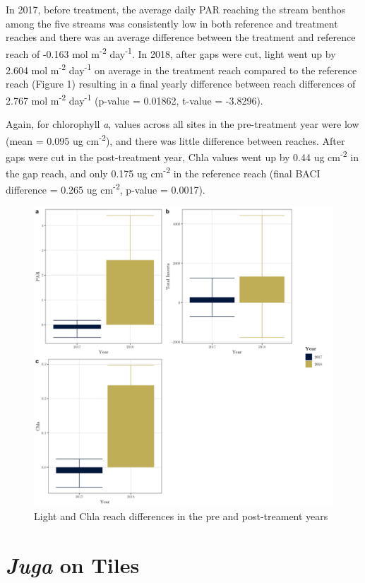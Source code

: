 \documentclass[double,12pt]{beavtex}
\begin{document}
  In 2017, before treatment, the average daily PAR reaching the stream
  benthos among the five streams was consistently low in both reference
  and treatment reaches and there was an average difference between the
  treatment and reference reach of -0.163 mol m\textsuperscript{-2}
  day\textsuperscript{-1}. In 2018, after gaps were cut, light went up by
  2.604 mol m\textsuperscript{-2} day\textsuperscript{-1} on average in
  the treatment reach compared to the reference reach (Figure 1) resulting
  in a final yearly difference between reach differences of 2.767 mol
  m\textsuperscript{-2} day\textsuperscript{-1} (p-value = 0.01862,
  t-value = -3.8296).
  
  Again, for chlorophyll \emph{a}, values across all sites in the
  pre-treatment year were low (mean = 0.095 ug cm\textsuperscript{-2}),
  and there was little difference between reaches. After gaps were cut in
  the post-treatment year, Chla values went up by 0.44 ug
  cm\textsuperscript{-2} in the gap reach, and only 0.175 ug
  cm\textsuperscript{-2} in the reference reach (final BACI difference =
  0.265 ug cm\textsuperscript{-2}, p-value = 0.0017).
  
  \begin{figure}
  
  {\centering \includegraphics[width=0.6\linewidth]{Figures/Vars_Reach_Diffs} 
  
  }
  
  \caption[Light and Chla reach differences in the pre and post-treament years \label{Chla-Light}]{Light and Chla reach differences in the pre and post-treament years \label{Chla-Light}}\label{fig:unnamed-chunk-1}
  \end{figure}
  
  \section*{\texorpdfstring{\emph{Juga} on
  Tiles}{Juga on Tiles}}\label{juga-on-tiles}
  
\end{document}
